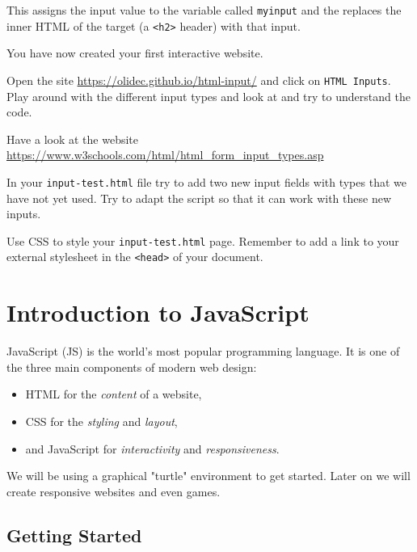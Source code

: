 \documentclass[11pt,a4paper]{report}
\begin{document}
This assigns the input value to the variable called \verb|myinput| and the replaces the inner HTML of the target (a \verb|<h2>| header) with that input.

You have now created your first interactive website.

\begin{ex}
Open the site \url{https://olidec.github.io/html-input/} and click on \verb|HTML Inputs|. Play around with the different input types and look at  and try to understand the code. 
\end{ex}

\begin{ex}
Have a look at the website \url{https://www.w3schools.com/html/html_form_input_types.asp}

In your \verb|input-test.html| file try to add two new input fields with types that we have not yet used. Try to adapt the script so that it can work with these new inputs.
\end{ex}

\begin{ex}
Use CSS to style your \verb|input-test.html| page. Remember to add a link to your external stylesheet in the \verb|<head>| of your document.
\end{ex}


\newpage

\section{Introduction to JavaScript}

JavaScript (JS) is the world's most popular programming language. It is one of the three main components of modern web design:
\begin{itemize}
\item HTML for the \emph{content} of a website,
\item CSS for the \emph{styling} and \emph{layout},
\item and JavaScript for \emph{interactivity} and \emph{responsiveness}.
\end{itemize}

We will be using a graphical "turtle" environment to get started. Later on we will create responsive websites and even games.

\subsection{Getting Started}
\end{document}

